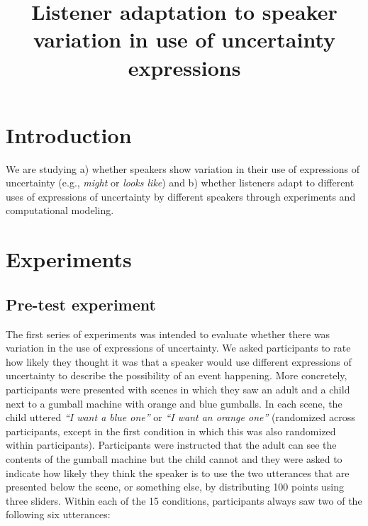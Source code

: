 \documentclass[lucida,biblatex]{sp} %
\title{Listener adaptation to speaker variation in use of uncertainty expressions}
\author{%
  \spauthor{Sebastian Schuster and Judith Degen\\ \today}
}
\begin{document}

\maketitle





\section{Introduction}

We are studying a) whether speakers show variation in their use of expressions of uncertainty (e.g., \textit{might} or \textit{looks like}) and b) whether listeners adapt to different uses of expressions of uncertainty by different speakers through experiments and computational modeling.

\section{Experiments}

\subsection{Pre-test experiment}

The first series of experiments was intended to evaluate whether there was variation in the use of expressions of uncertainty. We asked participants to rate how likely they thought it was that a speaker would use different expressions of uncertainty to describe the possibility of an event happening. More concretely, participants were presented with scenes in which they saw an adult and a child next to a gumball machine with orange and blue gumballs. In each scene, the child uttered \textit{``I want a blue one''} or  \textit{``I want an orange one''} (randomized across participants, except in the first condition in which this was also randomized within participants). Participants were instructed that the adult can see the contents of the gumball machine but the child cannot and they were asked to indicate how likely they think the speaker is to use the two utterances that are presented below the scene, or something else, by distributing 100 points using three sliders. Within each of the 15 conditions, participants always saw two of the following six utterances:
\end{document}
